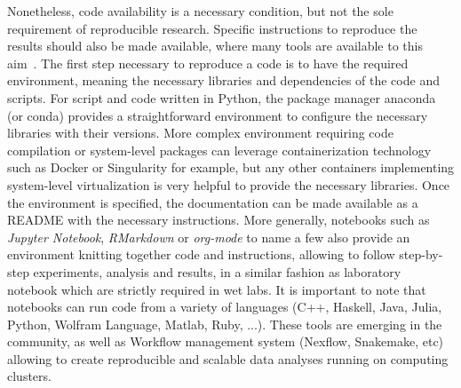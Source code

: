 Nonetheless, code availability is a necessary condition, but not the sole requirement of reproducible research.
Specific instructions to reproduce the results should also be made available, where many tools are available to this aim~\citep{Wilson2014,Darriba2018}.
The first step necessary to reproduce a code is to have the required environment, meaning the necessary libraries and dependencies of the code and scripts.
For script and code written in Python, the package manager anaconda (or conda) provides a straightforward environment to configure the necessary libraries with their versions.
More complex environment requiring code compilation or system-level packages can leverage containerization technology such as Docker or Singularity for example, but any other containers implementing system-level virtualization is very helpful to provide the necessary libraries.
Once the environment is specified, the documentation can be made available as a README with the necessary instructions.
More generally, notebooks such as \textit{Jupyter Notebook}, \textit{RMarkdown} or \textit{org-mode} to name a few also provide an environment knitting together code and instructions, allowing to follow step-by-step experiments, analysis and results, in a similar fashion as laboratory notebook which are strictly required in wet labs.
It is important to note that notebooks can run code from a variety of languages (C++, Haskell, Java, Julia, Python, Wolfram Language, Matlab, Ruby, ...).
These tools are emerging in the community, as well as Workflow management system (Nexflow, Snakemake, etc) allowing to create reproducible and scalable data analyses running on computing clusters.

